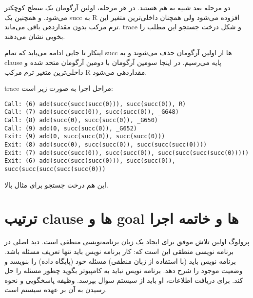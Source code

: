دو مرحله بعد شبیه به هم هستند. در هر مرحله، اولین آرگومان یک سطح کوچکتر می‌شود. و همچنین یک succ به R افزوده می‌شود ولی همچنان داخلی‌ترین متغیر این ترم مرکب بدون مقداردهی باقی می‌ماند. trace و شکل درخت جستجو این مطلب را بخوبی نشان می‌دهند.

اینکار تا جایی ادامه می‌یابد که تمام succ ‌ها از اولین آرگومان حذف می‌شوند و به  clause پایه می‌رسیم. در اینجا سومین آرگومان با دومین آرگومان متحد شده و داخلی‌ترین متغیر ترم مرکب R مقداردهی می‌شود.

trace مراحل اجرا به صورت زیر است:

\begin{latin}
\begin{lstlisting}
Call: (6) add(succ(succ(succ(0))), succ(succ(0)), R)
Call: (7) add(succ(succ(0)), succ(succ(0)), _G648)
Call: (8) add(succ(0), succ(succ(0)), _G650)
Call: (9) add(0, succ(succ(0)), _G652)
Exit: (9) add(0, succ(succ(0)), succ(succ(0)))
Exit: (8) add(succ(0), succ(succ(0)), succ(succ(succ(0))))
Exit: (7) add(succ(succ(0)), succ(succ(0)), succ(succ(succ(succ(0)))))
Exit: (6) add(succ(succ(succ(0))), succ(succ(0)), succ(succ(succ(succ(succ(0)))
\end{lstlisting}
\end{latin}

این هم درخت جستجو برای مثال بالا.

\begin{latin}
\end{latin}

\section{ترتیب clause ها و goal ها و خاتمه اجرا}
پرولوگ اولین تلاش موفق برای ایجاد یک زبان برنامه‌نویسی منطقی است. دید اصلی در برنامه نویسی منطقی این است که: کار برنامه نویس باید تنها تعریف مسئله باشد. برنامه نویس باید (با استفاده از زبان منطقی) مسئله خود (پایگاه داده) را بنویسد و وضعیت موجود را شرح دهد. برنامه نویس نباید به کامپیوتر بگوید چطور مسئله را حل کند. برای دریافت اطلاعات، او باید از سیستم سوال بپرسد. وظیفه پاسخگویی و نحوه رسیدن به آن بر عهده سیستم است.

